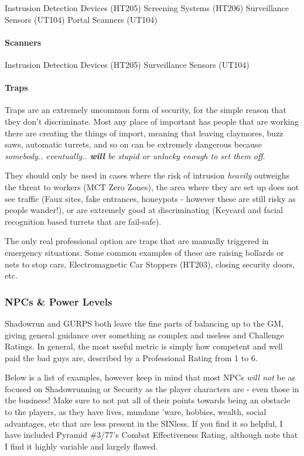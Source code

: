 \begin{multicols}{2}
	Instrusion Detection Devices (HT205)
	Screening Systems (HT206)
	Surveillance Sensors (UT104)
	Portal Scanners (UT104)
	
	\paragraph{Scanners}
	
	Instrusion Detection Devices (HT205)
	Surveillance Sensors (UT104)
	
	
	\paragraph{Traps}
	
	Traps are an extremely uncommon form of security, for the simple reason that they don't discriminate. Most any place of important has people that are working there are creating the things of import, meaning that leaving claymores, buzz saws, automatic turrets, and so on can be extremely dangerous because \textit{somebody.. eventually.. \textbf{will} be stupid or unlucky enough to set them off}.
	
	They should only be used in cases where the risk of intrusion \textit{heavily} outweighs the threat to workers (MCT Zero Zones), the area where they are set up does not see traffic (Faux sites, fake entrances, honeypots - however these are still risky as people wander!), or are extremely good at discriminating (Keycard and facial recognition based turrets that are fail-safe).
	
	The only real professional option are traps that are manually triggered in emergency situations. Some common examples of these are raising bollards or nets to stop cars, Electromagnetic Car Stoppers (HT203), closing security doors, etc.
	
	\subsubsection{NPCs \& Power Levels}
	
	Shadowrun and GURPS both leave the fine parts of balancing up to the GM, giving general guidance over something as complex and useless and Challenge Ratings. In general, the most useful metric is simply how competent and well paid the bad guys are, described by a Professional Rating from 1 to 6. 
	
	Below is a list of examples, however keep in mind that most NPCs \textit{will not} be as focused on Shadowrunning or Security as the player characters are - even those in the business! Make sure to not put all of their points towards being an obstacle to the players, as they have lives, mundane 'ware, hobbies, wealth, social advantages, etc that are less present in the SINless. If you find it so helpful, I have included Pyramid \#3/77's Combat Effectiveness Rating, although note that I find it highly variable and largely flawed.
	

\end{multicols}
